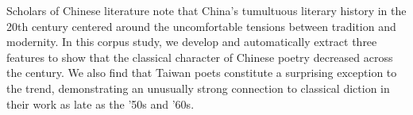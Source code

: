 Scholars of Chinese literature note that China's tumultuous literary history in the 20th century centered around the uncomfortable tensions between tradition
 and modernity. In this corpus study, we develop and automatically extract three
 features to show that the classical character of Chinese poetry decreased
 across
 the century. We also find that Taiwan poets constitute a surprising exception
 to the trend, demonstrating an unusually strong connection to classical diction
 in their work as late as the '50s and '60s.


